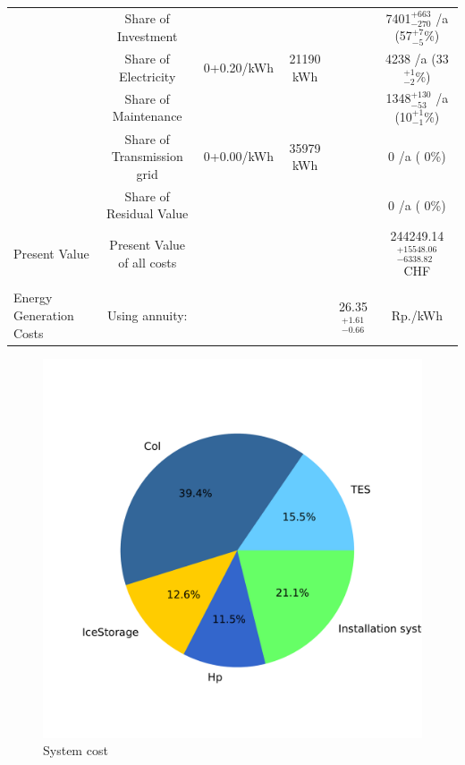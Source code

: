 \documentclass[english]{SPFShortReport}
\begin{document}
\begin{table}[!ht]
\begin{adjustbox}{max width =\textwidth}
\begin{tabular}{l | c c c c c }
 & Share of Investment & &&& 7401$^{\mathrm{+663}}_{\mathrm{-270}}$ /a (57$^{\mathrm{+ 7}}_{\mathrm{- 5}}$\%) \\
 & Share of Electricity & 0+0.20/kWh & 21190 kWh &  & 4238 /a (33$^{\mathrm{+ 1}}_{\mathrm{- 2}}$\%)\\
 & Share of Maintenance & &&& 1348$^{\mathrm{+130}}_{\mathrm{-53}}$ /a (10$^{\mathrm{+ 1}}_{\mathrm{- 1}}$\%)\\ 
 & Share of Transmission grid & 0+0.00/kWh & 35979 kWh & &  0 /a ( 0\%)\\
 & Share of Residual Value &&& &  0 /a ( 0\%)\\
Present Value  & Present Value of all costs  & &&& 244249.14$^{\mathrm{+15548.06}}_{\mathrm{-6338.82}}$ CHF \\
\hline \\ 
 Energy Generation Costs & Using annuity: &&& 26.35$^{\mathrm{+1.61}}_{\mathrm{-0.66}}$ & Rp./kWh \\
\hline
\hline
\end{tabular}
\end{adjustbox}
\label{CostsTable}
\end{table}
\begin{figure}[!htbp]
\begin{center}
\includegraphics[width=1\textwidth]{costShare-System6_SolarIce_MFH30_flatPlate_HP20-CHE_tmy-Ac50-Vice20.pdf}
\caption{System cost}
\label{systemCost}
\end{center}
\end{figure}
\end{document}

